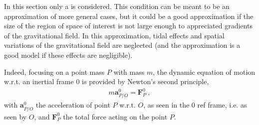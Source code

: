 \documentclass[letterpaper,10pt,english]{jupyterBook}
\begin{document}
\sphinxAtStartPar
In this section only a  is considered. This condition can be meant to be an approximation of more general cases, but it could be a good approximation if the size of the region of space of interest is not large enough to appreciated gradients of the gravitational field. In this  approximation, tidal effects and spatial variations of the gravitational field are neglected (and the approximation is a good model if these effects are negligible).

\sphinxAtStartPar
Indeed, focusing on a point mass \(P\) with mass \(m\), the dynamic equation of motion w.r.t. an inertial frame \(0\) is provided by Newton’s second principle,
\begin{equation*}
\begin{split}m \mathbf{a}^0_{P/O} = \mathbf{F}^0_P \ ,\end{split}
\end{equation*}
\sphinxAtStartPar
with \(\mathbf{a}^0_{P/O}\) the acceleration of point \(P\) w.r.t. \(O\), as seen in the \(0\) ref frame, i.e. as seen by \(O\), and \(\mathbf{F}^0_P\) the total force acting on the point \(P\).
\end{document}
